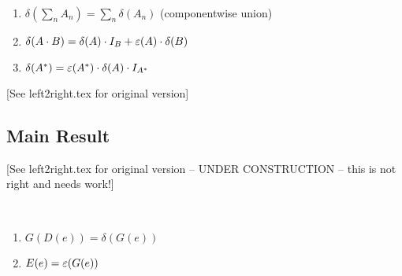 \documentclass{article}
\newcommand\ssum{\mathop{\textstyle\sum}}
\renewcommand\star{^*}
\begin{document}
\begin{lemma}\ 
\begin{enumerate}
\romanize
\item
$\delta(\ssum_n A_n)= \ssum_n \delta(A_n)$ (componentwise union)
\item
$\delta(A\cdot B) = \delta(A)\cdot I_B + \varepsilon(A)\cdot\delta(B)$
\item
$\delta(A\star) = \eps(A\star)\cdot\delta(A)\cdot I_{A^*}$
\end{enumerate}
\end{lemma}

[See left2right.tex for original version]

\subsection*{Main Result}

[See left2right.tex for original version -- UNDER CONSTRUCTION -- this is not right and needs work!]

\begin{lemma}\ 
\begin{enumerate}
\romanize
\item
$G(D(e)) = \delta(G(e))$
\item
$E(e) = \varepsilon(G(e))$
\end{enumerate}
\end{lemma}
\end{document}
